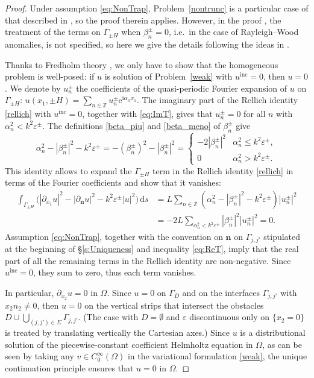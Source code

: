 \documentclass[a4paper,10pt]{article}
\newcommand{\IZ}{{\mathbb Z}}
\newcommand{\bn}{{\mathbf n}}
\newcommand{\ri}{{\mathrm i}}
\newcommand{\re}{{\mathrm e}}
\newcommand{\rd}{{\,\mathrm d}}
\newcommand{\inc}{{\mathrm{inc}}}
\newcommand{\dn}{{\partial_\bn}}
\newcommand{\dxo}{{\partial_{x_1}}}
\newcommand{\GD}{{\Gamma_D}}
\newcommand{\GpmH}{{\Gamma_{\pm H}}}
\begin{document}
\begin{proof}
Under assumption \eqref{eq:NonTrap}, Problem~\eqref{nontrunc} is a particular case of that described in \cite[Theorem~3.5]{BonnetBD1994}, so the proof therein applies.
However, in the proof \cite[Theorem~3.5]{BonnetBD1994}, 
the treatment of the terms on $\GpmH$ when $\beta_n^\pm=0$, i.e.\ in the case of Rayleigh--Wood anomalies, is not specified, so here we give the details following the ideas in \cite[Theorem~4.5]{Strycharz1998}.

Thanks to Fredholm theory \cite[Theorem~3.2]{BonnetBD1994}, we only have to show that the homogeneous problem is well-posed: 	if $u$ is solution of Problem~\eqref{weak} with $u^\inc=0$, then $u=0$.
We denote by $u_n^\pm$ the coefficients of the quasi-periodic Fourier expansion of $u$ on $\GpmH$:
$u(x_1,\pm H)=\sum_{n\in\IZ}u_n^\pm \re^{\ri\alpha_nx_1}$.
The imaginary part of the Rellich identity \eqref{rellich} with $u^\inc=0$, together with \eqref{eq:ImT}, gives that $u_n^\pm=0$ for all $n$ with $\alpha_n^2<k^2\varepsilon^\pm$.
The definitions \eqref{beta_piu} and \eqref{beta_meno} of $\beta_n^\pm$ give
\begin{equation}\label{Beta_nExpansion}
	\alpha_n^2-|\beta_n^\pm|^2-k^2\varepsilon^\pm =-(\beta_n^\pm)^2-|\beta_n^\pm|^2 =
	\begin{cases}
		-2|\beta_n^\pm|^2 &\alpha_n^2\le k^2\varepsilon^\pm,\\
		0&\alpha_n^2> k^2\varepsilon^\pm.
	\end{cases}
\end{equation}
This identity allows to expand the $\GpmH$ term in the Rellich identity \eqref{rellich} 
in terms of the Fourier coefficients and show that it vanishes:
\begin{align*}
	\int_\GpmH\bigg(
	\left| \dxo u \right|^2 - \left| \dn u \right|^2 -k^2\varepsilon^\pm |u|^2 
	\bigg)\rd s
	&=L\sum_{n\in\IZ}(\alpha_n^2-|\beta_n^\pm|^2-k^2\varepsilon^\pm)|u_n^\pm|^2\\
	&= - 2 L \sum_{\alpha^2_n < k^2\varepsilon^\pm} |\beta_n^\pm|^2 |u_n^\pm|^2 =0.
\end{align*}
Assumption \eqref{eq:NonTrap}, together with the convention on $\bn$ on $\Gamma_{j,j'}$ stipulated at the beginning of \S\ref{s:Uniqueness} and inequality \eqref{eq:ReT}, imply that the real part of all the remaining terms in the Rellich identity are non-negative.
Since $u^\inc=0$, they sum to zero, thus each term vanishes.

In particular, $\partial_{x_2}u=0$ 
in $\Omega$.
Since $u=0$ on $\GD$ and on the interfaces $\Gamma_{j,j'}$ with $x_2n_2\ne0$, then $u=0$ on the vertical strips that intersect the obstacles $D\cup\bigcup_{(j,j')\in \Sigma}\Gamma_{j,j'}$.
(The case with $D=\emptyset$ and $\varepsilon$ discontinuous only on $\{x_2=0\}$ is treated by translating vertically the Cartesian axes.)
Since $u$ is a distributional solution of the piecewise-constant coefficient Helmholtz equation in $\Omega$, as can be seen by taking any $v\in C^\infty_0(\Omega)$ in the variational formulation \eqref{weak}, the unique continuation principle \cite[Theorem~8.6]{ColtonKress2019} ensures that $u=0$ in $\Omega$.
\end{proof}
\end{document}
